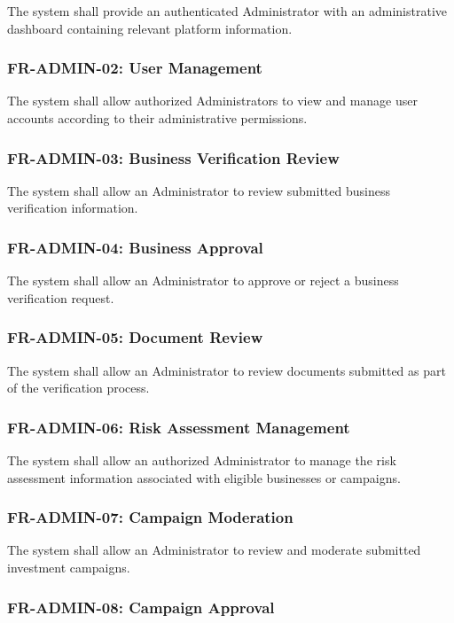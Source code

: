 The system shall provide an authenticated Administrator with an
administrative dashboard containing relevant platform information.

\subsubsection{FR-ADMIN-02: User Management}

The system shall allow authorized Administrators to view and manage user
accounts according to their administrative permissions.

\subsubsection{FR-ADMIN-03: Business Verification Review}

The system shall allow an Administrator to review submitted business
verification information.

\subsubsection{FR-ADMIN-04: Business Approval}

The system shall allow an Administrator to approve or reject a business
verification request.

\subsubsection{FR-ADMIN-05: Document Review}

The system shall allow an Administrator to review documents submitted as
part of the verification process.

\subsubsection{FR-ADMIN-06: Risk Assessment Management}

The system shall allow an authorized Administrator to manage the risk
assessment information associated with eligible businesses or campaigns.

\subsubsection{FR-ADMIN-07: Campaign Moderation}

The system shall allow an Administrator to review and moderate submitted
investment campaigns.

\subsubsection{FR-ADMIN-08: Campaign Approval}

